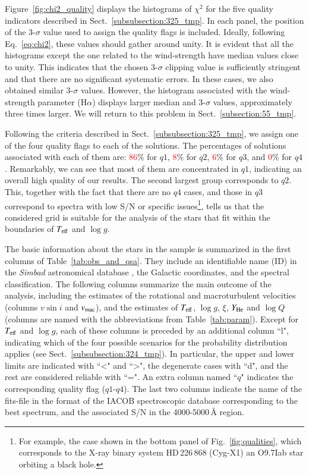\documentclass{aa}
\newcommand{\vsini}{\mbox{$v\sin i$}\xspace}
\newcommand{\vmac} {$v_{\rm mac}$\xspace}
\newcommand{\vmic}{$\xi$\xspace}
\newcommand{\Teff}{\mbox{$T_{\rm eff}$}\xspace}
\newcommand{\logg}{\mbox{$\log g$}\xspace}
\newcommand{\logQ}{\mbox{$\log Q$}\xspace}
\newcommand{\He}{$Y_{\rm He}$\xspace}
\let\oldAA\AA
\renewcommand*{\AA}{\,\oldAA\xspace}
\newcommand{\num}[1]{\textcolor{red}{#1}}
\begin{document}
Figure~\ref{fig:chi2_quality} displays the histograms of $\chi^{2}$ for the five quality indicators described in Sect.~\ref{subsubsection:325_tmp}. In each panel, the position of the 3-$\sigma$ value used to assign the quality flags is included. Ideally, following Eq.~\ref{eq:chi2}, these values should gather around unity. It is evident that all the histograms except the one related to the wind-strength have median values close to unity. This indicates that the chosen 3-$\sigma$ clipping value is sufficiently stringent and that there are no significant systematic errors. In these cases, we also obtained similar 3-$\sigma$ values. However, the histogram associated with the wind-strength parameter (H$\alpha$) displays larger median and 3-$\sigma$ values, approximately three times larger. We will return to this problem in Sect.~\ref{subsection:55_tmp}.

Following the criteria described in Sect.~\ref{subsubsection:325_tmp}, we assign one of the four quality flags to each of the solutions. The percentages of solutions associated with each of them are: \num{86}\% for $q1$, \num{8}\% for $q2$, \num{6}\% for $q3$, and \num{0}\% for $q4$. Remarkably, we can see that most of them are concentrated in $q1$, indicating an overall high quality of our results. The second largest group corresponds to $q2$. This, together with the fact that there are no $q4$ cases, and those in $q3$ correspond to spectra with low S/N or specific issues\footnote{For example, the case shown in the bottom panel of Fig.~\ref{fig:qualities}, which corresponds to the X-ray binary system HD\,226\,868 (Cyg-X1) an O9.7Iab star orbiting a black hole.}, tells us that the considered grid is suitable for the analysis of the stars that fit within the boundaries of \Teff and \logg.

The basic information about the stars in the sample is summarized in the first columns of Table~\ref{tab:obs_and_qsa}. They include an identifiable name (ID) in the \textit{Simbad} astronomical database \citep{weis20}, the Galactic coordinates, and the spectral classification. The following columns summarize the main outcome of the analysis, including the estimates of the rotational and macroturbulent velocities (columns \vsini and \vmac), and the estimates of \Teff, \logg, \vmic, \He and \logQ (columns are named with the abbreviations from Table~\ref{tab:param}). Except for \Teff and \logg, each of these columns is preceded by an additional column ``l", indicating which of the four possible scenarios for the probability distribution applies (see Sect.~\ref{subsubsection:324_tmp}). In particular, the upper and lower limits are indicated with ``<" and ``>", the degenerate cases with ``d", and the rest are considered reliable with ``=". An extra column named ``$q$" indicates the corresponding quality flag ($q1$-$q4$).
The last two columns indicate the name of the fits-file in the format of the IACOB spectroscopic database corresponding to the best spectrum, and the associated S/N in the 4000-5000\AA region. 
\end{document}
